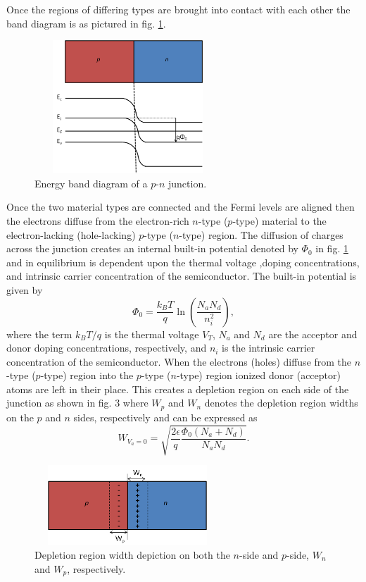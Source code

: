 Once the regions of differing types are brought into contact with each other the band diagram is as
pictured in fig. \ref{fig:fig02}. 
\begin{figure}[h!]\label{fig:fig02}
    \centering
    \includegraphics[height=5cm,width=7cm]{figs/unbiased_pn_junction_bands_connected}
    \caption{Energy band diagram of a $p$-$n$ junction.}
\end{figure}
Once the two material types are connected and the Fermi levels are aligned then the electrons
diffuse from the electron-rich $n$-type ($p$-type) material to the electron-lacking (hole-lacking)
$p$-type ($n$-type) region. The diffusion of charges across the junction creates an internal
built-in potential denoted by $\Phi_0$ in fig. \ref{fig:fig02} and in equilibrium is dependent upon 
the thermal voltage ,doping concentrations, and intrinsic carrier concentration of the semiconductor. 
The built-in potential is given by 
\begin{equation}
    \label{eq:phi0_eq}
    \Phi_0 = \frac{k_BT}{q}\ln{\left(\frac{N_aN_d}{n_i^2}\right)},
\end{equation}
where the term $k_BT/q$ is the thermal voltage $V_T$, $N_a$ and $N_d$ are the acceptor and donor doping concentrations, respectively, and
$n_i$ is the intrinsic carrier concentration of the semiconductor. When the electrons (holes) diffuse from the $n$-type ($p$-type) 
region into the $p$-type ($n$-type) region ionized donor (acceptor) atoms are left in their place. This creates a depletion region on each side of the 
junction as shown in fig. 3 where $W_p$ and $W_n$ denotes the depletion region widths on the $p$ and $n$
sides, respectively and can be expressed as
\begin{equation}\label{eq:depletion_width}
    W_{V_a=0} = \sqrt{\frac{2\epsilon}{q}\frac{\Phi_0\left(N_a+N_d\right)}{N_aN_d}}.
\end{equation}
\begin{figure}[h!]\label{fig:fig03}
    \centering
    \includegraphics[height=3cm,width=7cm]{figs/unbias_pn_junction_depletion_region}
    \caption{Depletion region width depiction on both the $n$-side and $p$-side, $W_n$ and $W_p$, respectively.}
\end{figure}
